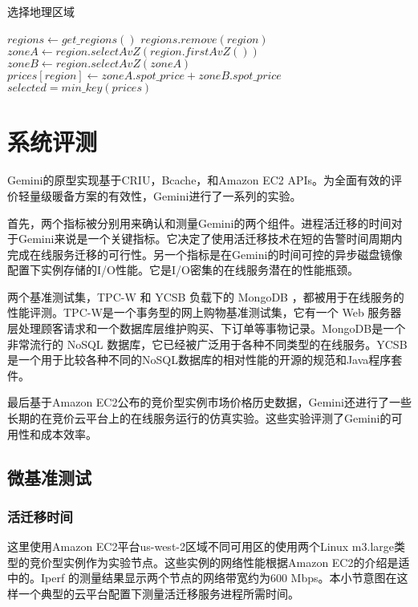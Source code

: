 \begin{algorithm}
\caption{选择地理区域}
\label{figure:region-selection-algo}

$regions\gets get\_regions()$\;
{
  {
    $regions.remove(region)$\;
  }
}
{
  $zoneA\gets region.selectAvZ(region.firstAvZ())$\;
  $zoneB\gets region.selectAvZ(zoneA)$\;
  $prices[region]\gets zoneA.spot\_price + zoneB.spot\_price$\;
}
$selected = min\_key(prices)$\;
\end{algorithm}

\section{系统评测}
Gemini的原型实现基于CRIU，Bcache，和Amazon EC2 APIs。为全面有效的评价轻量级暖备方案的有效性，Gemini进行了一系列的实验。

首先，两个指标被分别用来确认和测量Gemini的两个组件。进程活迁移的时间对于Gemini来说是一个关键指标。它决定了使用活迁移技术在短的告警时间周期内完成在线服务迁移的可行性。另一个指标是在Gemini的时间可控的异步磁盘镜像配置下实例存储的I/O性能。它是I/O密集的在线服务潜在的性能瓶颈。

两个基准测试集，TPC-W\cite{TPCW:2014} 和 YCSB\cite{YCSB:2014} 负载下的 MongoDB \cite{Mongodb:2014}，都被用于在线服务的性能评测。TPC-W是一个事务型的网上购物基准测试集，它有一个 Web 服务器层处理顾客请求和一个数据库层维护购买、下订单等事物记录。MongoDB是一个非常流行的 NoSQL 数据库，它已经被广泛用于各种不同类型的在线服务。YCSB是一个用于比较各种不同的NoSQL数据库的相对性能的开源的规范和Java程序套件。

最后基于Amazon EC2公布的竞价型实例市场价格历史数据，Gemini还进行了一些长期的在竞价云平台上的在线服务运行的仿真实验。这些实验评测了Gemini的可用性和成本效率。

\subsection{微基准测试}

\subsubsection{活迁移时间}
\label{gemini-migrationtime}
这里使用Amazon EC2平台us-west-2区域不同可用区的使用两个Linux m3.large类型的竞价型实例作为实验节点。这些实例的网络性能根据Amazon EC2的介绍是适中的。Iperf \cite{Iperf:2014} 的测量结果显示两个节点的网络带宽约为600 Mbps。本小节意图在这样一个典型的云平台配置下测量活迁移服务进程所需时间。

